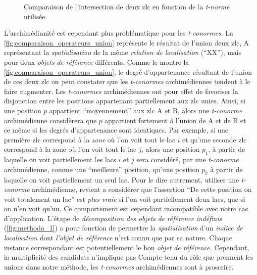 \begin{figure}
  \centering
  
  \caption{Comparaison de l'intersection de deux \ac{zlc} en fonction
    de la \emph{t-norme} utilisée.}
  \label{fig:comparaison_operateurs_intersection}
\end{figure}

L'archimédianité est cependant plus problématique pour les
\emph{t-conormes.} La \autoref{fig:comparaison_operateurs_union}
représente le résultat de l'union deux \ac{zlc},
\textcolor{RdBu-9-1}{\textsf{A}} représentant la \emph{spatialisation}
de la même \emph{relation de localisation} (\enquote{XX}), mais pour
deux \emph{objets de référence} différents. Comme le montre la
\autoref{fig:comparaison_operateurs_union}, le degré d'appartenance
résultant de l'union de ces deux \ac{zlc} on peut constater que les
\emph{t-conormes} archimédiennes tendent à le faire augmenter.
%
Les \emph{t-conormes} archimédiennes ont pour effet de favoriser la
disjonction entre les positions appartenant partiellement aux \ac{zlc}
unies. Ainsi, si une position \(p\) appartient \enquote{moyennement}
aux \ac{zlc} \textcolor{RdBu-9-1}{\textsf{A}} et
\textcolor{RdBu-9-9}{\textsf{B}}, alors une \emph{t-conorme}
archimédienne considèrera que \(p\) appartient fortement à l'union de
\textcolor{RdBu-9-1}{\textsf{A}} et de
\textcolor{RdBu-9-9}{\textsf{B}} et ce même si les degrés
d'appartenance sont identiques. Par exemple, si une première \ac{zlc}
correspond à la \emph{zone} où l'on voit tout le lac \(i\) et qu'une
seconde \ac{zlc} correspond à la zone où l'on voit tout le lac \(j\),
alors une position \(p_1\), à partir de laquelle on voit partiellement
les lacs \(i\) et \(j\) sera considéré, par une \emph{t-conorme}
archimédienne, comme une \enquote{meilleure} position, qu'une position
\(p_2\) à partir de laquelle on voit partiellement un seul lac. Pour
le dire autrement, utiliser une \emph{t-conorme} archimédienne,
revient a considérer que l'assertion \enquote{De cette position on
  voit totalement un lac} est \emph{plus vraie} si l'on voit
partiellement deux lacs, que si on n'en voit qu'un. Ce comportement
est cependant incompatible avec notre cas d'application.
%
L'étape de \emph{décomposition des objets de référence indéfinis}
(\autoref{fig:methodo_1}) a pour fonction de permettre la
\emph{spatialisation} d'un \emph{indice de localisation} dont
\emph{l'objet de référence} n'est connu que par sa nature. Chaque
instance correspondant est potentiellement le bon \emph{objet de
  référence.} Cependant, la multiplicité des candidats n'implique pas
%
Compte-tenu du rôle que prennent les unions dans notre méthode, les
\emph{t-conormes} archimédiennes sont à proscrire.

